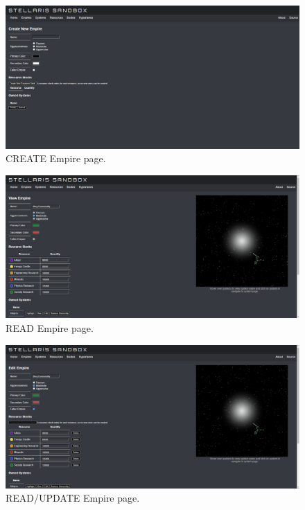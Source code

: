 \documentclass[12pt]{article}
\begin{document}
\begin{figure}[!ht]
  \caption{CREATE Empire page.}
  \includegraphics[width=\textwidth]{screenshots/empires/empire_create.png}
\end{figure}

\begin{figure}[!ht]
  \caption{READ Empire page.}
  \includegraphics[width=\textwidth]{screenshots/empires/empire_read.png}
\end{figure}

\begin{figure}[!ht]
  \caption{READ/UPDATE Empire page.}
  \includegraphics[width=\textwidth]{screenshots/empires/empire_read_update.png}
\end{figure}
\end{document}
